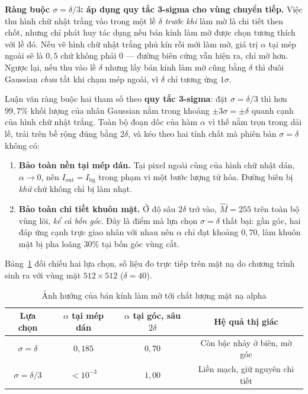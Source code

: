 \textbf{Ràng buộc $\sigma = \delta/3$: áp dụng quy tắc 3-sigma cho vùng chuyển tiếp.} Việc thu hình chữ nhật trắng vào trong một lề $\delta$ \textit{trước khi} làm mờ là chi tiết then chốt, nhưng chỉ phát huy tác dụng nếu bán kính làm mờ được chọn tương thích với lề đó. Nếu vẽ hình chữ nhật trắng phủ kín rồi mới làm mờ, giá trị $\alpha$ tại mép ngoài sẽ là $0{,}5$ chứ không phải 0 --- đường biên cứng vẫn hiện ra, chỉ mờ hơn. Ngược lại, nếu thu vào lề $\delta$ nhưng lấy bán kính làm mờ cũng bằng $\delta$ thì đuôi Gaussian \textit{chưa} tắt khi chạm mép ngoài, vì $\delta$ chỉ tương ứng $1\sigma$.

Luận văn ràng buộc hai tham số theo \textbf{quy tắc 3-sigma}: đặt $\sigma = \delta/3$ thì hơn $99{,}7\%$ khối lượng của nhân Gaussian nằm trong khoảng $\pm 3\sigma = \pm\delta$ quanh cạnh của hình chữ nhật trắng. Toàn bộ đoạn dốc của hàm $\alpha$ vì thế nằm trọn trong dải lề, trải trên bề rộng đúng bằng $2\delta$, và kéo theo hai tính chất mà phiên bản $\sigma = \delta$ không có:

\begin{enumerate}
    \item \textbf{Bảo toàn nền tại mép dán.} Tại pixel ngoài cùng của hình chữ nhật dán, $\alpha \to 0$, nên $I_{\text{out}} = I_{\text{bg}}$ trong phạm vi một bước lượng tử hóa. Đường biên bị \textit{khử} chứ không chỉ bị làm nhạt.
    \item \textbf{Bảo toàn chi tiết khuôn mặt.} Ở độ sâu $2\delta$ trở vào, $\hat{M} = 255$ trên toàn bộ vùng lõi, \textit{kể cả bốn góc}. Đây là điểm mà lựa chọn $\sigma = \delta$ thất bại: gần góc, hai đáp ứng cạnh trực giao nhân với nhau nên $\alpha$ chỉ đạt khoảng $0{,}70$, làm khuôn mặt bị pha loãng $30\%$ tại bốn góc vùng cắt.
\end{enumerate}

Bảng~\ref{tab:sigma_choice} đối chiếu hai lựa chọn, số liệu đo trực tiếp trên mặt nạ do chương trình sinh ra với vùng mặt $512 \times 512$ ($\delta = 40$).

\begin{table}[H]
\caption{Ảnh hưởng của bán kính làm mờ tới chất lượng mặt nạ alpha}
\label{tab:sigma_choice}
\centering
\begin{tabular}{|c|c|c|c|}
\hline
\textbf{Lựa chọn} & \textbf{$\alpha$ tại mép dán} & \textbf{$\alpha$ tại góc, sâu $2\delta$} & \textbf{Hệ quả thị giác} \\
\hline
$\sigma = \delta$ & $0{,}185$ & $0{,}70$ & Còn bậc nhảy ở biên, mờ góc \\
\hline
$\sigma = \delta/3$ & $< 10^{-3}$ & $1{,}00$ & Liền mạch, giữ nguyên chi tiết \\
\hline
\end{tabular}
\end{table}

